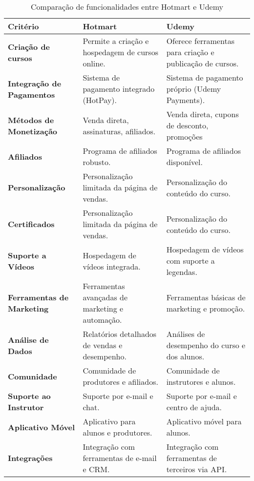 \begin{table}[h]
    \centering
    \caption{Comparação de funcionalidades entre Hotmart e Udemy}
    \begin{tabular}{|p{5cm}|p{5cm}|p{5cm}|}
        \hline
        \textbf{Critério} & \textbf{Hotmart} & \textbf{Udemy} \\
        \hline
        \textbf{Criação de cursos} & Permite a criação e hospedagem de cursos online. & Oferece ferramentas para criação e publicação de cursos. \\
        \hline
        \textbf{Integração de Pagamentos} & Sistema de pagamento integrado (HotPay). & Sistema de pagamento próprio (Udemy Payments). \\
        \hline
        \textbf{Métodos de Monetização} & Venda direta, assinaturas, afiliados. & Venda direta, cupons de desconto, promoções \\
        \hline
        \textbf{Afiliados} & Programa de afiliados robusto. & Programa de afiliados disponível. \\
        \hline
        \textbf{Personalização} & Personalização limitada da página de vendas. & Personalização do conteúdo do curso. \\
        \hline
        \textbf{Certificados} & Personalização limitada da página de vendas. & Personalização do conteúdo do curso. \\
        \hline
        \textbf{Suporte a Vídeos} & Hospedagem de vídeos integrada. & Hospedagem de vídeos com suporte a legendas. \\
        \hline
        \textbf{Ferramentas de Marketing} & Ferramentas avançadas de marketing e automação. & Ferramentas básicas de marketing e promoção. \\
        \hline
        \textbf{Análise de Dados} & Relatórios detalhados de vendas e desempenho. & Análises de desempenho do curso e dos alunos. \\
        \hline
        \textbf{Comunidade} & Comunidade de produtores e afiliados. & Comunidade de instrutores e alunos. \\
        \hline
        \textbf{Suporte ao Instrutor} & Suporte por e-mail e chat. & Suporte por e-mail e centro de ajuda. \\
        \hline
        \textbf{Aplicativo Móvel} & Aplicativo para alunos e produtores. & Aplicativo móvel para alunos. \\
        \hline
        \textbf{Integrações} & Integração com ferramentas de e-mail e CRM. & Integração com ferramentas de terceiros via API. \\

\end{tabular}
\end{table}
